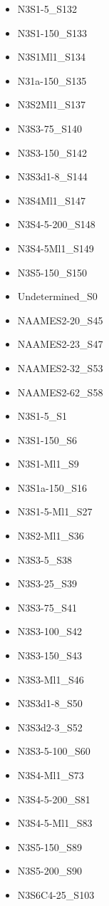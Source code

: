 \documentclass{article}
\begin{document}
\begin{multicols}{3}
    \begin{itemize}
\item N3S1-5\_S132
\item N3S1-150\_S133
\item N3S1Ml1\_S134
\item N31a-150\_S135
\item N3S2Ml1\_S137
\item N3S3-75\_S140
\item N3S3-150\_S142
\item N3S3d1-8\_S144
\item N3S4Ml1\_S147	
\item N3S4-5-200\_S148
\item N3S4-5Ml1\_S149
\item N3S5-150\_S150	
\item Undetermined\_S0
\item NAAMES2-20\_S45
\item NAAMES2-23\_S47
\item NAAMES2-32\_S53
\item NAAMES2-62\_S58
\item N3S1-5\_S1
\item N3S1-150\_S6
\item N3S1-Ml1\_S9
\item N3S1a-150\_S16
\item N3S1-5-Ml1\_S27
\item N3S2-Ml1\_S36
\item N3S3-5\_S38
\item N3S3-25\_S39
\item N3S3-75\_S41
\item N3S3-100\_S42
\item N3S3-150\_S43
\item N3S3-Ml1\_S46
\item N3S3d1-8\_S50
\item N3S3d2-3\_S52
\item N3S3-5-100\_S60
\item N3S4-Ml1\_S73
\item N3S4-5-200\_S81
\item N3S4-5-Ml1\_S83
\item N3S5-150\_S89
\item N3S5-200\_S90
\item N3S6C4-25\_S103
\end{itemize}
    \end{multicols}
\end{document}
